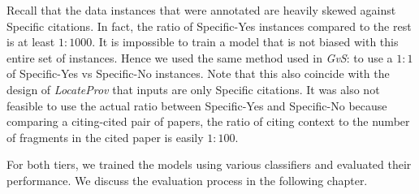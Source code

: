 Recall that the data instances that were annotated are heavily skewed against Specific citations. In fact, the ratio of Specific-Yes instances compared to the rest is at least $1:1000$. It is impossible to train a model that is not biased with this entire set of instances. Hence we used the same method used in {\it GvS}: to use a $1:1$ of Specific-Yes vs Specific-No instances. Note that this also coincide with the design of {\it LocateProv} that inputs are only Specific citations. It was also not feasible to use the actual ratio between Specific-Yes and Specific-No because comparing a citing-cited pair of papers, the ratio of citing context to the number of fragments in the cited paper is easily $1:100$.

For both tiers, we trained the models using various classifiers and evaluated their performance. We discuss the evaluation process in the following chapter.
